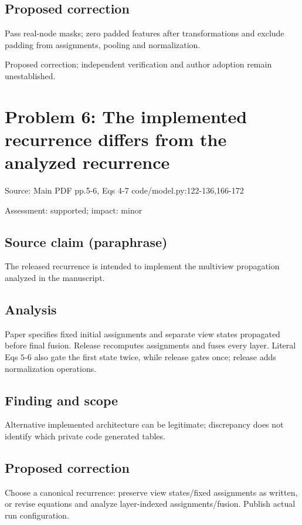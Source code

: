 \documentclass[11pt]{article}
\begin{document}
\subsection*{Proposed correction}

Pass real-node masks; zero padded features after transformations and exclude padding from assignments, pooling and normalization.

Proposed correction; independent verification and author adoption remain unestablished.

\section*{Problem 6: The implemented recurrence differs from the analyzed recurrence}

Source: Main PDF pp.5-6, Eqs 4-7 code/model.py:122-136,166-172

Assessment: supported; impact: minor

\subsection*{Source claim (paraphrase)}

The released recurrence is intended to implement the multiview propagation analyzed in the manuscript.

\subsection*{Analysis}

Paper specifies fixed initial assignments and separate view states propagated before final fusion. Release recomputes assignments and fuses every layer. Literal Eqs \(5\)-\(6\) also gate the first state twice, while release gates once; release adds normalization operations.

\subsection*{Finding and scope}

Alternative implemented architecture can be legitimate; discrepancy does not identify which private code generated tables.

\subsection*{Proposed correction}

Choose a canonical recurrence: preserve view states/fixed assignments as written, or revise equations and analyze layer-indexed assignments/fusion. Publish actual run configuration.
\end{document}
